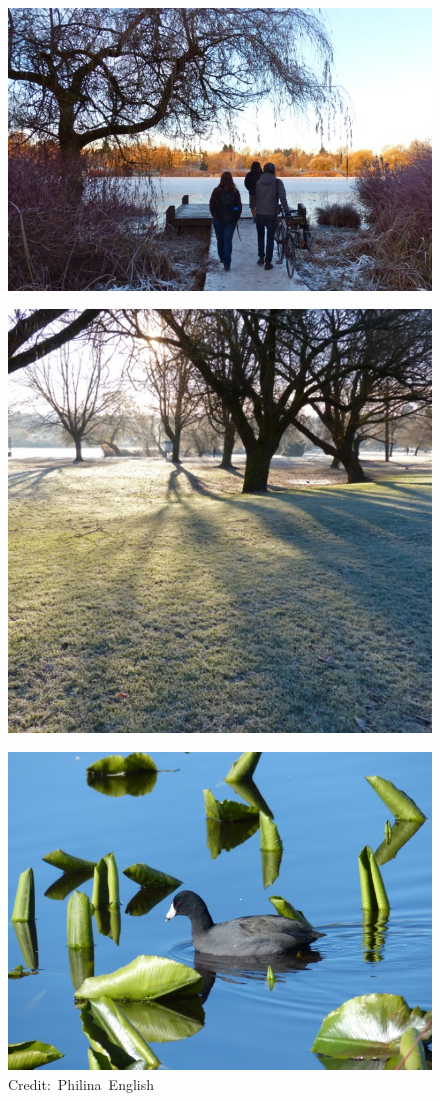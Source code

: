 \begin{figure}[t]
  \centering
  \includegraphics[width=\textwidth]{photos/snowydock}
\end{figure}
\begin{figure}[h!]
  \centering
  \includegraphics[width=\textwidth]{photos/frosty1}
\end{figure}
\begin{figure}[b]
  \centering
  \includegraphics[width=\textwidth]{photos/AMCO}
  \hspace*{15pt}\hbox{\scriptsize Credit: Philina English}
\end{figure}

